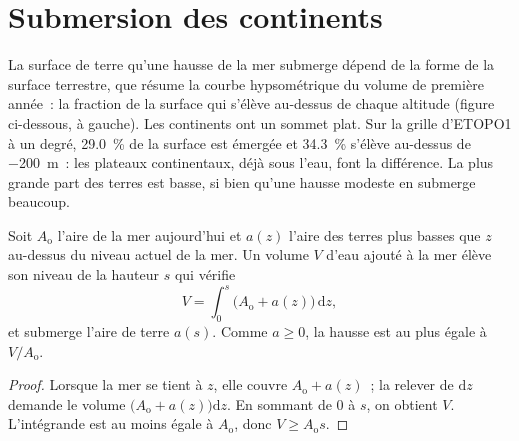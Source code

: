 \section{Submersion des continents}\label{sec:b2:phanerozoic-earth:flooding}

La surface de terre qu'une hausse de la mer submerge dépend de la forme de la surface terrestre, que
résume la courbe hypsométrique du volume de première année~: la fraction de la surface qui s'élève
au-dessus de chaque altitude (figure ci-dessous, à gauche). Les continents ont un sommet plat. Sur
la grille d'ETOPO1 à un degré, \qty{29.0}{\percent} de la surface est émergée et \qty{34.3}{\percent}
s'élève au-dessus de \qty{-200}{m}~: les plateaux continentaux, déjà sous l'eau, font la différence.
La plus grande part des terres est basse, si bien qu'une hausse modeste en submerge beaucoup.

\begin{proposition}\label{prop:b2:phanerozoic-earth:flooding}
Soit $A_{\text{o}}$ l'aire de la mer aujourd'hui et $a(z)$ l'aire des
terres plus basses que $z$ au-dessus du niveau actuel de la mer. Un volume
$V$ d'eau ajouté à la mer élève son niveau de la hauteur $s$ qui vérifie
\[
V = \int_0^s \bigl(A_{\text{o}} + a(z)\bigr)\,\mathrm{d}z ,
\]
et submerge l'aire de terre $a(s)$. Comme $a \ge 0$, la hausse est au plus égale à $V/A_{\text{o}}$.
\end{proposition}

\begin{proof}
Lorsque la mer se tient à $z$, elle couvre $A_{\text{o}} + a(z)$~; la relever de $\mathrm{d}z$
demande le volume $\bigl(A_{\text{o}} + a(z)\bigr)\mathrm{d}z$. En sommant de 0 à $s$, on
obtient $V$. L'intégrande est au moins égale à $A_{\text{o}}$, donc $V \ge A_{\text{o}}s$.
\end{proof}

